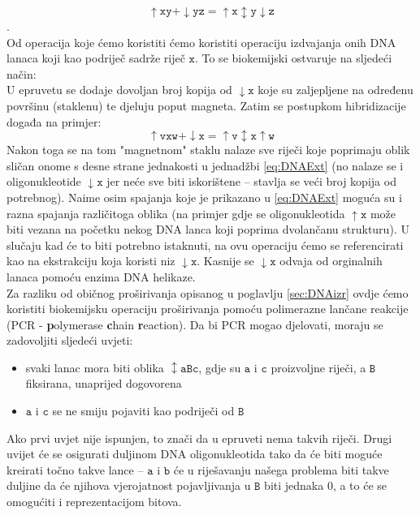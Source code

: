 \documentclass[a4paper,oneside,12pt]{memoir} %
\begin{document}
\begin{spacing}{1.5}
\[\mathtt{\uparrow xy + \downarrow yz = \uparrow x \updownarrow y \downarrow z}\].\\
Od operacija koje ćemo koristiti ćemo koristiti operaciju izdvajanja onih DNA lanaca koji kao podriječ sadrže riječ $\mathtt{x}$. To se biokemijski ostvaruje na sljedeći način:\\
U epruvetu se dodaje dovoljan broj kopija od $\mathtt{\downarrow x}$ koje su zaljepljene na određenu površinu (staklenu) te djeluju poput magneta. Zatim se postupkom hibridizacije događa na primjer:
\begin{equation}
\label{eq:DNAExt}
\mathtt{\uparrow vxw + \downarrow x = \uparrow v \updownarrow x \uparrow w}
\end{equation}
Nakon toga se na tom "magnetnom" staklu nalaze sve riječi koje poprimaju oblik sličan onome s desne strane jednakosti u jednadžbi \ref{eq:DNAExt} (no nalaze se i oligonukleotide $\mathtt{\downarrow x}$ jer neće sve biti iskorištene -- stavlja se veći broj kopija od potrebnog). Naime osim spajanja koje je prikazano u \ref{eq:DNAExt} moguća su i razna spajanja različitoga oblika (na primjer gdje se oligonukleotida $\mathtt{\uparrow x}$ može biti vezana na početku nekog DNA lanca koji poprima dvolančanu strukturu). U slučaju kad će to biti potrebno istaknuti, na ovu operaciju ćemo se referencirati kao na ekstrakciju koja koristi niz $\mathtt{\downarrow x}$. Kasnije se $\mathtt{\downarrow x}$ odvaja od orginalnih lanaca pomoću enzima DNA helikaze.\\[0.5cm]
Za razliku od običnog proširivanja opisanog u poglavlju \ref{sec:DNAizr} ovdje ćemo koristiti biokemijsku operaciju proširivanja pomoću polimerazne lančane reakcije (PCR - \textbf{p}olymerase \textbf{c}hain \textbf{r}eaction). Da bi PCR mogao djelovati, moraju se zadovoljiti sljedeći uvjeti:
\begin{itemize}
\item svaki lanac mora biti oblika $\mathtt{\updownarrow aBc}$, gdje su $\mathtt{a}$ i $\mathtt{c}$ proizvoljne riječi, a $\mathtt{B}$ fiksirana, unaprijed dogovorena
\item $\mathtt{a}$ i $\mathtt{c}$ se ne smiju pojaviti kao podriječi od $\mathtt{B}$
\end{itemize}
Ako prvi uvjet nije ispunjen, to znači da u epruveti nema takvih riječi. Drugi uvijet će se osigurati duljinom DNA oligonukleotida tako da će biti moguće kreirati točno takve lance -- $\mathtt{a}$ i $\mathtt{b}$ će u riješavanju našega problema biti takve duljine da će njihova vjerojatnost pojavljivanja u $\mathtt{B}$ biti jednaka 0, a to će se omogućiti i reprezentacijom bitova.\\[0.5cm]

\end{spacing}
\end{document}

